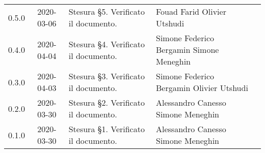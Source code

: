{\begin{longtable}{ c c  C{4cm}  C{4cm}  C{3cm} }
		0.5.0 & 2020-03-06 & Stesura \S 5. Verificato il documento.  & Fouad Farid \newline Olivier Utshudi &\Res{} \newline \ver{}\\
		0.4.0 & 2020-04-04 & Stesura \S 4. Verificato il documento. & Simone Federico Bergamin \newline Simone Meneghin &\adm{} \newline \ver{}\\	
		0.3.0 & 2020-04-03 & Stesura \S 3. Verificato il documento.  & Simone Federico Bergamin \newline Olivier Utshudi &\adm{} \newline \ver{}\\	
		0.2.0 & 2020-03-30 & Stesura \S 2. Verificato il documento.  & Alessandro Canesso \newline Simone Meneghin &\Res{} \newline \ver{}\\	
		0.1.0 & 2020-03-30 & Stesura \S 1. Verificato il documento. & Alessandro Canesso \newline Simone Meneghin &\Res{} \newline \ver{}\\		
	\end{longtable}
} 
